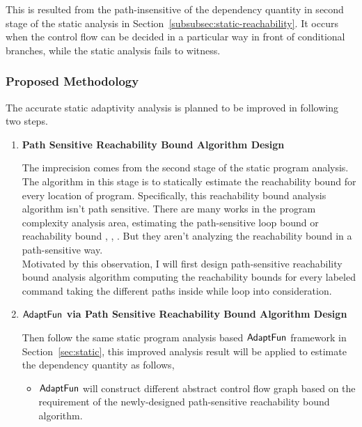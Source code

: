 This is resulted from the  path-insensitive of the dependency quantity in
second stage of the static analysis in Section~\ref{subsubsec:static-reachability}.
It occurs when the control flow can be decided in a particular way in front of conditional branches, 
while the static analysis fails to witness. 


\subsubsection{Proposed Methodology}
\label{subsubsec:furthers-reachability}
The accurate static adaptivity analysis is planned to be improved in following two steps.
\begin{enumerate}
    \item \textbf{Path Sensitive Reachability Bound Algorithm Design}
    
    The imprecision comes from the second stage of the static program analysis.
    The algorithm in this stage is to statically estimate the 
    reachability bound for every location of program.
    Specifically, this reachability bound analysis algorithm isn't path sensitive. 
    There are many works in the program complexity analysis area, estimating the path-sensitive loop bound 
    or reachability bound
    \cite{GustafssonEL05, HumenbergerJK18}, 
    \cite{BrockschmidtEFFG16,AlbertAGP08,AliasDFG10,Flores-MontoyaH14}, 
    \cite{GulwaniZ10, SinnZV17,GulwaniJK09, GulwaniMC09, abs-2203-04243}. 
    But they aren't analyzing the reachability
    bound in a path-sensitive way.
    \\
    Motivated by this observation, I will first design path-sensitive reachability bound analysis algorithm computing the 
    reachability bounds for every labeled command taking the different paths inside while loop into consideration.
    \item \textbf{$\textsf{AdaptFun}$ via Path Sensitive Reachability Bound Algorithm Design}

    Then follow the same static program analysis based $\textsf{AdaptFun}$ framework in Section~\ref{sec:static},
this improved analysis result will be applied to estimate the dependency quantity as follows,
\begin{itemize}
    \item $\textsf{AdaptFun}$ will construct different abstract control flow graph based on the requirement of the newly-designed
    path-sensitive reachability bound algorithm.


\end{itemize}
\end{enumerate}
